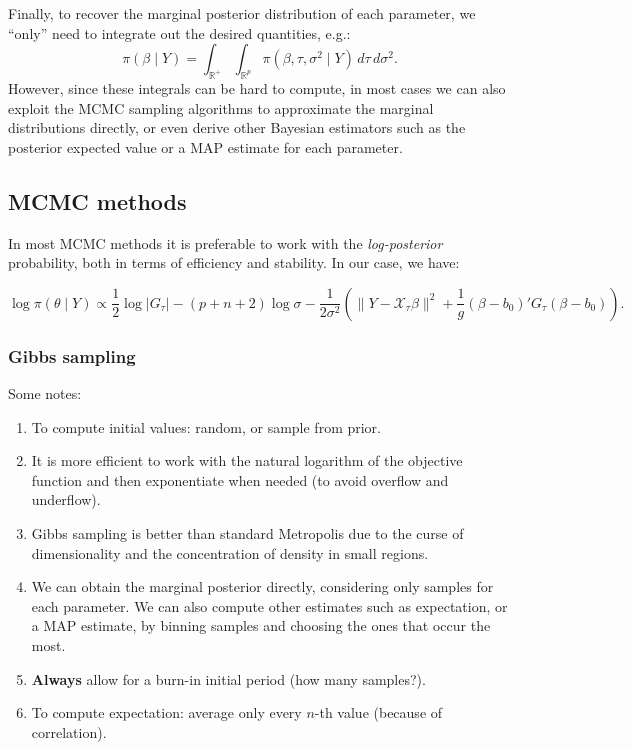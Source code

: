 \documentclass[
  a4paper,
	fontsize=11pt, %
	twoside=false, %
  secnumdepth=2,
	numbers=noenddot, %
]{kaohandt}
\newcommand{\R} {\ensuremath{\mathds{R}}}
\begin{document}
Finally, to recover the marginal posterior distribution of each parameter, we ``only'' need to integrate out the desired quantities, e.g.:
\[
  \pi(\beta\mid Y) = \int_{\R^+}\int_{\R^p} \pi(\beta, \tau, \sigma^2\mid Y)\, d\tau\, d\sigma^2.
\]
However, since these integrals can be hard to compute, in most cases we can also exploit the MCMC sampling algorithms to approximate the marginal distributions directly, or even derive other Bayesian estimators such as the posterior expected value or a MAP estimate for each parameter.
\subsection{MCMC methods}

In most MCMC methods it is preferable to work with the \textit{log-posterior} probability, both in terms of efficiency and stability. In our case, we have:
\begin{widepar}
  \[
    \log \pi(\theta\mid Y) \propto \frac{1}{2}\log |G_\tau| - (p+n+2)\log \sigma -\frac{1}{2\sigma^2} \left(\|Y- \mathcal X_\tau\beta\|^2 + \frac{1}{g}(\beta - b_0)'G_\tau(\beta - b_0) \right).
  \]
\end{widepar}

\subsubsection{Gibbs sampling}

Some notes:

\begin{enumerate}
  \item To compute initial values: random, or sample from prior.
  \item It is more efficient to work with the natural logarithm of the objective function and then exponentiate when needed (to avoid overflow and underflow).
  \item Gibbs sampling is better than standard Metropolis due to the curse of dimensionality and the concentration of density in small regions.
  \item We can obtain the marginal posterior directly, considering only samples for each parameter. We can also compute other estimates such as expectation, or a MAP estimate, by binning samples and choosing the ones that occur the most.
  \item \textbf{Always} allow for a burn-in initial period (how many samples?).
  \item To compute expectation: average only every \(n\)-th value (because of correlation).
\end{enumerate}
\end{document}
